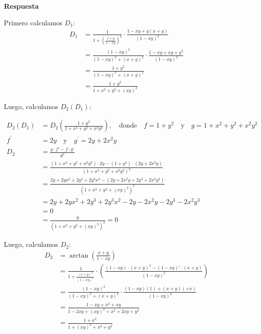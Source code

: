\documentclass{report}
\begin{document}
    \textbf{Respuesta}

    Primero calculamos $D_{1}$:
    \[
    \begin{aligned}
    D_{1} &= \frac{1}{1+\left(\frac{x+y}{1-xy}\right)^{2}} \cdot \frac{1 - xy + y(x+y)}{(1 - xy)^{2}} \\
    &= \frac{(1-xy)^{2}}{(1 - xy)^{2} + (x+y)^{2}} \cdot \frac{1 - xy + xy + y^{2}}{(1-xy)^{2}} \\
    &= \frac{1 + y^{2}}{(1 - xy)^{2} + (x + y)^{2}} \\
    &= \frac{1 + y^{2}}{1 + x^{2} + y^{2} + (xy)^{2}}
    \end{aligned}
    \]

    Luego, calculamos $D_{2}\left(D_{1}\right)$:

    \[
    \begin{aligned}
    D_{2}\left(D_{1}\right) &= D_{2}\left(\frac{1 + y^{2}}{1 + x^{2} + y^{2} + x^{2} y^{2}}\right), \quad \text{donde} \quad f = 1 + y^{2} \quad \text{y} \quad g = 1 + x^{2} + y^{2} + x^{2} y^{2} \\
    f^{\prime} &= 2y \quad \text{y} \quad g^{\prime} = 2y + 2x^{2} y \\
    D_{2} &= \frac{g \cdot f' - f \cdot g'}{g^{2}} \\
    &= \frac{\left(1 + x^{2} + y^{2} + x^{2} y^{2}\right) \cdot 2y - \left(1 + y^{2}\right) \cdot \left(2y + 2x^{2} y\right)}{\left(1 + x^{2} + y^{2} + x^{2} y^{2}\right)^{2}} \\
    &= \frac{2y + 2y x^{2} + 2y^{3} + 2y^{3} x^{2} - \left(2y + 2x^{2} y + 2y^{3} + 2x^{2} y^{3}\right)}{\left(1 + x^{2} + y^{2} + (xy)^{2}\right)^{2}} \\
    &= 2y + 2y x^{2} + 2y^{3} + 2y^{3} x^{2} - 2y - 2x^{2} y - 2y^{3} - 2x^{2} y^{3} \\
    &= 0 \\
    &= \frac{0}{\left(1 + x^{2} + y^{2} + (xy)^{2}\right)^{2}} = 0
    \end{aligned}
    \]

    Luego, calculamos $D_{2}$:
    \[
    \begin{aligned}
    D_{2} &= \arctan \left(\frac{x + y}{1 - xy}\right) \\
    &= \frac{1}{1 + \frac{(x + y)^{2}}{(1 - xy)^{2}}} \cdot \left( \frac{(1 - xy) \cdot (x + y)^{3} - (1 - xy)' \cdot (x + y)}{(1 - xy)^{2}} \right) \\
    &= \frac{(1 - xy)^{2}}{(1 - xy)^{2} + (x + y)^{2}} \cdot \frac{(1 - xy)(1) + (x + y)(+x)}{(1 - xy)^{2}} \\
    &= \frac{1 - xy + x^{2} + xy}{1 - 2xy + (xy)^{2} + x^{2} + 2xy + y^{2}} \\
    &= \frac{1 + x^{2}}{1 + (xy)^{2} + x^{2} + y^{2}}
    \end{aligned}
    \]
\end{document}
